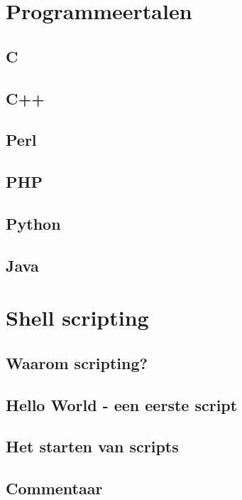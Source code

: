 \documentclass[a4paper,12pt,twoside,openright,titlepage]{book}
\begin{document}
\chapter{Programmeertalen}


\section{C}

\section{C++}

\section{Perl}

\section{PHP}

\section{Python}

\section{Java}


\chapter{Shell scripting}

\section{Waarom scripting?}

\section{Hello World - een eerste script}

\section{Het starten van scripts}

\section{Commentaar}

\end{document}
